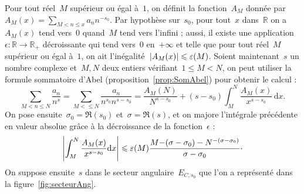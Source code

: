 		\begin{dem}
			Pour tout réel~$M$ supérieur ou égal à~$1$,  on définit la fonction~$A_M$ donnée par~$A_M(x)=\sum_{M<n\leq x} a_n n^{-s_0}$. Par hypothèse sur~$s_0$, pour tout~$x$ dans~$\mathbb{R}$ on a~$A_M(x)$ tend vers~$0$ quand~$M$ tend vers l'infini ; aussi, il existe une application~$\epsilon :\mathbb{R} \rightarrow\mathbb{R}_+$ décroissante qui tend vers~$0$ en~$+\infty$ et telle que pour tout réel~$M$ supérieur ou égal à~$1$, on ait l'inégalité~$\left\vert A_M(x)\right\vert\leqslant\varepsilon(M)$. Soient maintenant~$s$ un nombre complexe et~$M,N$ deux entiers vérifiant~$1\leq M<N$, on peut utiliser la formule sommatoire d'Abel (proposition~\ref{prop:SomAbel}) pour obtenir  le calcul :
			\begin{equation}\label{eq:DirichPropDem}
				\sum_{M<n\leq N} \frac{a_n}{n^s} = \sum_{M<\leq N} \frac{a_n}{n^{s_0}n^{s-s_0}}
				= \frac{A_M(N)}{N^{s-s_0}} + (s-s_0) \int_{M}^{N} \frac{A_M(x)}{x^{s-s_0}} \,\mathrm{d}x.
			\end{equation}
			On pose ensuite~$\sigma_0=\Re(s_0)$ et~$\sigma=\Re(s)$, et on majore l'intégrale précédente en valeur absolue grâce à la décroissance de la fonction~$\epsilon$ :
			\[
				\left\vert \int_M^N \frac{A_M(x)}{x^{s-s_0}}\mathrm{d}x\right\vert \leqslant \varepsilon(M) \frac{M{-(\sigma-\sigma_0)}-N^{-(\sigma-\sigma_0)}}{\sigma-\sigma_0}\cdot
			\]
			On suppose ensuite~$s$ dans le secteur angulaire~$E_{C,s_0}$ que l'on a représenté dans la figure~\ref{fig:secteurAng}.
			\begin{figure}[h]
				\begin{multicols}{2}
					\begin{center}
					\end{center}
					\columnbreak
					

\end{multicols}
\end{figure}
\end{dem}
